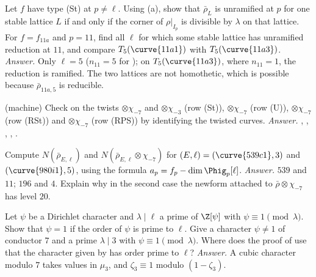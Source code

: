 \begin{exercise}\label{exer:modgalrep:steinberg-unramified}
Let $f$ have type (St) at $p\ne\ell$. Using (a), show that $\bar\rho_L$ is unramified at $p$ for one stable lattice $L$ if and only if the corner of
$\rho|_{I_p}$ is divisible by $\lambda$ on that lattice. For $f=f_{11a}$ and $p=11$, find all $\ell$ for which some stable lattice has unramified reduction at $11$, and compare
$T_5(\curve{11a1})$ with $T_5(\curve{11a3})$. \emph{Answer.} Only $\ell=5$ ($n_{11}=5$ for ); on $T_5(\curve{11a3})$, where $n_{11}=1$, the reduction is ramified. The two lattices
are not homothetic, which is possible because $\bar\rho_{11a,5}$ is reducible.
\end{exercise}

\begin{exercise}\label{exer:modgalrep:twist-table}
(machine) Check  on the twists $\otimes\chi_{-7}$ and $\otimes\chi_{-3}$ (row (St)), $\otimes\chi_{-7}$ (row (U)), $\otimes\chi_{-7}$ (row
(RSt)) and $\otimes\chi_{-7}$ (row (RPS)) by identifying the twisted curves. \emph{Answer.} , , , , .
\end{exercise}

\begin{exercise}\label{exer:modgalrep:serre-conductors}
Compute $N(\bar\rho_{E,\ell})$ and $N(\bar\rho_{E,\ell}\otimes\chi_{-7})$ for $(E,\ell)=(\curve{539c1},3)$ and $(\curve{980i1},5)$, using the formula $a_p=f_p-\dim\Phig_p[\ell]$. \emph{Answer.} $539$ and $11$;
$196$ and $4$. Explain why in the second case the newform attached to $\bar\rho\otimes\chi_{-7}$ has level $20$.
\end{exercise}

\begin{exercise}\label{exer:modgalrep:nebentypus}
Let $\psi$ be a Dirichlet character and $\lambda\mid\ell$ a prime of $\Z[\psi]$ with $\psi\equiv1\pmod\lambda$. Show that $\psi=1$ if the order of $\psi$ is prime to $\ell$. Give a character $\psi\ne1$ of
conductor $7$ and a prime $\lambda\mid3$ with $\psi\equiv1\pmod\lambda$. Where does the proof of  use that the character given by
 has order prime to $\ell$? \emph{Answer.} A cubic character modulo $7$ takes values in $\mu_3$, and $\zeta_3\equiv1$ modulo $(1-\zeta_3)$.
\end{exercise}

